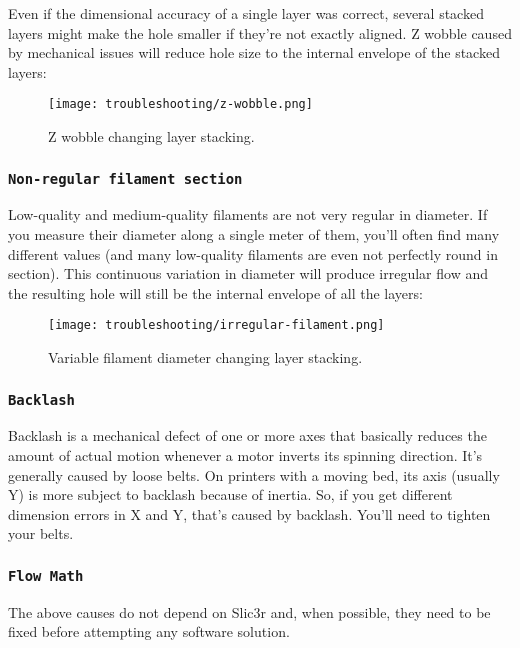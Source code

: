 Even if the dimensional accuracy of a single layer was correct, several stacked layers might make the hole smaller if they're not exactly aligned. Z wobble caused by mechanical issues will reduce hole size to the internal envelope of the stacked layers:

\begin{figure}[H]
\centering
\texttt{[image: troubleshooting/z-wobble.png]}
\caption{Z wobble changing layer stacking.}
\label{fig:z-wobble}
\end{figure}

\subsubsection{\texttt{Non-regular filament section}}

Low-quality and medium-quality filaments are not very regular in diameter. If you measure their diameter along a single meter of them, you'll often find many different values (and many low-quality filaments are even not perfectly round in section). This continuous variation in diameter will produce irregular flow and the resulting hole will still be the internal envelope of all the layers:

\begin{figure}[H]
\centering
\texttt{[image: troubleshooting/irregular-filament.png]}
\caption{Variable filament diameter changing layer stacking.}
\label{fig:irregular-filament}
\end{figure}

\subsubsection{\texttt{Backlash}}

Backlash is a mechanical defect of one or more axes that basically reduces the amount of actual motion whenever a motor inverts its spinning direction. It's generally caused by loose belts. On printers with a moving bed, its axis (usually Y) is more subject to backlash because of inertia. So, if you get different dimension errors in X and Y, that's caused by backlash. You'll need to tighten your belts.

\subsubsection{\texttt{Flow Math}}
The above causes do not depend on Slic3r and, when possible, they need to be fixed before attempting any software solution.

